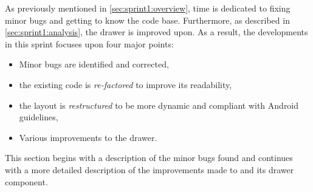 As previously mentioned in \cref{sec:sprint1:overview}, time is dedicated to fixing minor bugs and getting to know the code base.
Furthermore, as described in \cref{sec:sprint1:analysis}, the drawer is improved upon.
As a result, the developments in this sprint focuses upon four major points:

\begin{itemize}
\item Minor bugs are identified and corrected,
\item the existing code is \textit{re-factored} to improve its readability,
\item the layout is \textit{restructured} to be more dynamic and compliant with Android guidelines,
\item Various improvements to the drawer.
\end{itemize}

This section begins with a description of the minor bugs found and continues with a more detailed description of the improvements made to \launcher and its drawer component.